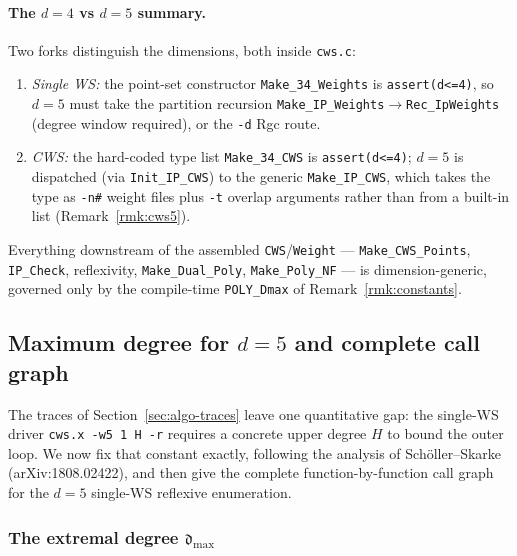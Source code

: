 \documentclass{amsart}
\begin{document}
\paragraph{The $d=4$ vs $d=5$ summary.} Two forks distinguish the dimensions,
both inside \texttt{cws.c}:
\begin{enumerate}
  \item \emph{Single WS:} the point-set constructor \texttt{Make\_34\_Weights}
        is \texttt{assert(d<=4)}, so $d=5$ must take the partition recursion
        \texttt{Make\_IP\_Weights}$\to$\texttt{Rec\_IpWeights} (degree window
        required), or the \texttt{-d} Rgc route.
  \item \emph{CWS:} the hard-coded type list \texttt{Make\_34\_CWS} is
        \texttt{assert(d<=4)}; $d=5$ is dispatched (via \texttt{Init\_IP\_CWS})
        to the generic \texttt{Make\_IP\_CWS}, which takes the type as
        \texttt{-n\#} weight files plus \texttt{-t} overlap arguments rather
        than from a built-in list (Remark~\ref{rmk:cws5}).
\end{enumerate}
Everything downstream of the assembled \texttt{CWS}/\texttt{Weight} ---
\texttt{Make\_CWS\_Points}, \texttt{IP\_Check}, reflexivity,
\texttt{Make\_Dual\_Poly}, \texttt{Make\_Poly\_NF} --- is dimension-generic,
governed only by the compile-time \texttt{POLY\_Dmax} of
Remark~\ref{rmk:constants}.

\subsection{Maximum degree for $d=5$ and complete call graph}
\label{sec:algo-maxdeg}

The traces of Section~\ref{sec:algo-traces} leave one quantitative gap: the
single-WS driver \texttt{cws.x -w5 1 H -r} requires a concrete upper degree
$H$ to bound the outer loop. We now fix that constant exactly, following the
analysis of Sch\"oller--Skarke (arXiv:1808.02422), and then give the complete
function-by-function call graph for the $d=5$ single-WS reflexive enumeration.

\subsubsection*{The extremal degree $\mathfrak{d}_{\max}$}
\end{document}
